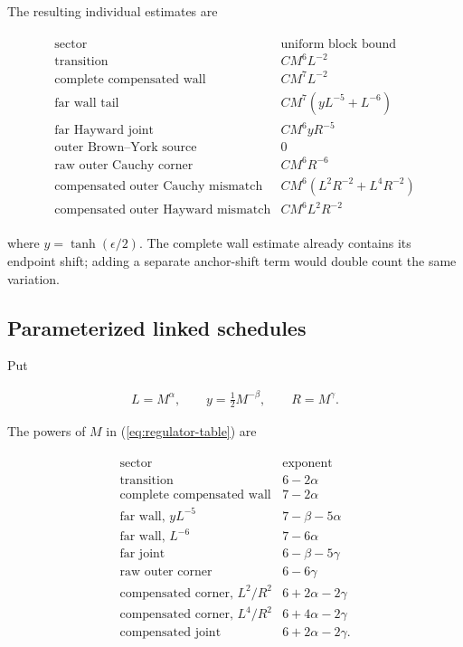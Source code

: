 The resulting individual estimates are

\begin{align}
\begin{array}{c|c}
\text{sector} & \text{uniform block bound}\\ \hline
\text{transition} & C M^6L^{-2}\\
\text{complete compensated wall} & C M^7L^{-2}\\
\text{far wall tail} & C M^7(yL^{-5}+L^{-6})\\
\text{far Hayward joint} & C M^6yR^{-5}\\
\text{outer Brown--York source} & 0\\
\text{raw outer Cauchy corner} & C M^6R^{-6}\\
\text{compensated outer Cauchy mismatch}
& C M^6(L^2R^{-2}+L^4R^{-2})\\
\text{compensated outer Hayward mismatch} & C M^6L^2R^{-2}
\end{array}
\label{eq:regulator-table}
\end{align}

where $y=\tanh(\epsilon/2)$. The complete wall estimate already contains its endpoint shift; adding a separate anchor-shift term would double count the same variation.

\subsection{Parameterized linked schedules}\label{subsec:parameterized-schedules}

Put

\begin{align}
L=M^\alpha,
\qquad
y=\frac12M^{-\beta},
\qquad
R=M^\gamma .
\end{align}

The powers of $M$ in (\ref{eq:regulator-table}) are

\begin{align}
\begin{array}{c|c}
\text{sector} & \text{exponent}\\ \hline
\text{transition} & 6-2\alpha\\
\text{complete compensated wall} & 7-2\alpha\\
\text{far wall, }yL^{-5} & 7-\beta-5\alpha\\
\text{far wall, }L^{-6} & 7-6\alpha\\
\text{far joint} & 6-\beta-5\gamma\\
\text{raw outer corner} & 6-6\gamma\\
\text{compensated corner, }L^2/R^2 & 6+2\alpha-2\gamma\\
\text{compensated corner, }L^4/R^2 & 6+4\alpha-2\gamma\\
\text{compensated joint} & 6+2\alpha-2\gamma .
\end{array}
\label{eq:regulator-exponents}
\end{align}

